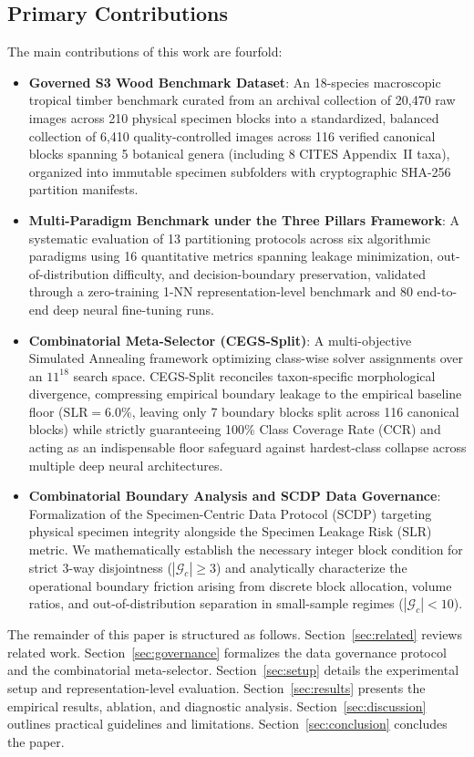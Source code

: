 \documentclass[a4paper,fleqn]{cas-sc}
\begin{document}
\subsection{Primary Contributions}
The main contributions of this work are fourfold:
\begin{itemize}
\item \textbf{Governed S3 Wood Benchmark Dataset}: An 18-species macroscopic tropical timber benchmark curated from an archival collection of 20,470 raw images across 210 physical specimen blocks into a standardized, balanced collection of 6,410 quality-controlled images across 116 verified canonical blocks spanning 5 botanical genera (including 8 CITES Appendix~II taxa), organized into immutable specimen subfolders with cryptographic SHA-256 partition manifests.
\item \textbf{Multi-Paradigm Benchmark under the Three Pillars Framework}: A systematic evaluation of 13 partitioning protocols across six algorithmic paradigms using 16 quantitative metrics spanning leakage minimization, out-of-distribution difficulty, and decision-boundary preservation, validated through a zero-training 1-NN representation-level benchmark and 80 end-to-end deep neural fine-tuning runs.
\item \textbf{Combinatorial Meta-Selector (CEGS-Split)}: A multi-objective Simulated Annealing framework optimizing class-wise solver assignments over an $11^{18}$ search space. CEGS-Split reconciles taxon-specific morphological divergence, compressing empirical boundary leakage to the empirical baseline floor ($\mathrm{SLR} = 6.0\%$, leaving only 7 boundary blocks split across 116 canonical blocks) while strictly guaranteeing 100\% Class Coverage Rate ($\mathrm{CCR}$) and acting as an indispensable floor safeguard against hardest-class collapse across multiple deep neural architectures.
\item \textbf{Combinatorial Boundary Analysis and SCDP Data Governance}: Formalization of the Specimen-Centric Data Protocol (SCDP) targeting physical specimen integrity alongside the Specimen Leakage Risk ($\mathrm{SLR}$) metric. We mathematically establish the necessary integer block condition for strict 3-way disjointness ($|\mathcal{G}_c| \ge 3$) and analytically characterize the operational boundary friction arising from discrete block allocation, volume ratios, and out-of-distribution separation in small-sample regimes ($|\mathcal{G}_c| < 10$).
\end{itemize}

The remainder of this paper is structured as follows. Section~\ref{sec:related} reviews related work. Section~\ref{sec:governance} formalizes the data governance protocol and the combinatorial meta-selector. Section~\ref{sec:setup} details the experimental setup and representation-level evaluation. Section~\ref{sec:results} presents the empirical results, ablation, and diagnostic analysis. Section~\ref{sec:discussion} outlines practical guidelines and limitations. Section~\ref{sec:conclusion} concludes the paper.
\end{document}
